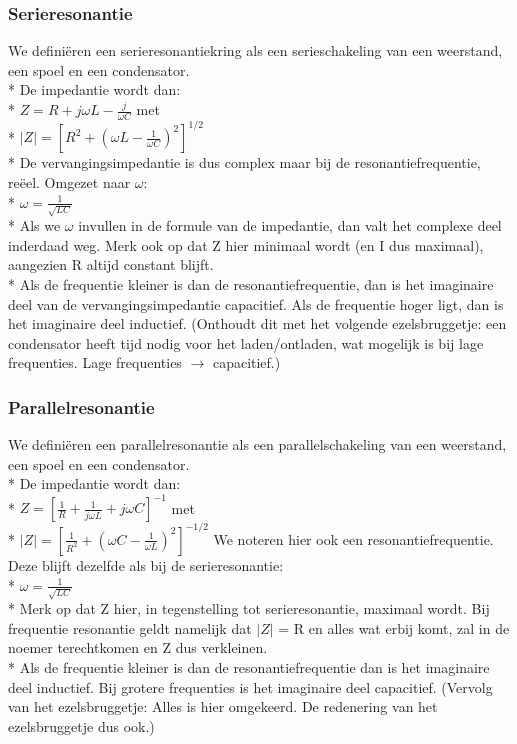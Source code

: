 \documentclass[10pt]{article}
\begin{document}
\subsubsection{Serieresonantie}
We defini\"eren een serieresonantiekring als een serieschakeling van een weerstand, een spoel en een condensator.\\*
De impedantie wordt dan:\\*
$Z = R + j\omega L - \frac{j}{\omega C}$ met\\*
$|Z| = \left[R^2 + (\omega L - \frac{1}{\omega C})^2\right]^{1/2}$\\*
De vervangingsimpedantie is dus complex maar bij de resonantiefrequentie, re\"eel. Omgezet naar $\omega$:\\*
$\omega = \frac{1}{\sqrt{LC}}$\\*
Als we $\omega$ invullen in de formule van de impedantie, dan valt het complexe deel inderdaad weg. Merk ook op dat Z hier minimaal wordt (en I dus maximaal), aangezien R altijd constant blijft.\\*
Als de frequentie kleiner is dan de resonantiefrequentie, dan is het imaginaire deel van de vervangingsimpedantie capacitief. Als de frequentie hoger ligt, dan is het imaginaire deel inductief. {\scriptsize (Onthoudt dit met het volgende ezelsbruggetje: een condensator heeft tijd nodig voor het laden/ontladen, wat mogelijk is bij lage frequenties. Lage frequenties $\rightarrow$ capacitief.)}
\subsubsection{Parallelresonantie}
We defini\"eren een parallelresonantie als een parallelschakeling van een weerstand, een spoel en een condensator.\\*
De impedantie wordt dan:\\*
$Z = \left[\frac{1}{R} + \frac{1}{j\omega L} + j\omega C\right]^{-1}$ met\\*
$|Z| = \left[\frac{1}{R^2} + (\omega C - \frac{1}{\omega L})^2\right]^{-1/2}$
We noteren hier ook een resonantiefrequentie. Deze blijft dezelfde als bij de serieresonantie:\\*
$\omega = \frac{1}{\sqrt{LC}}$\\*
Merk op dat Z hier, in tegenstelling tot serieresonantie, maximaal wordt. Bij frequentie resonantie geldt namelijk dat $|Z|$ = R en alles wat erbij komt, zal in de noemer terechtkomen en Z dus verkleinen.\\*
Als de frequentie kleiner is dan de resonantiefrequentie dan is het imaginaire deel inductief. Bij grotere frequenties is het imaginaire deel capacitief. {\scriptsize (Vervolg van het ezelsbruggetje: Alles is hier omgekeerd. De redenering van het ezelsbruggetje dus ook.)}
\end{document}
